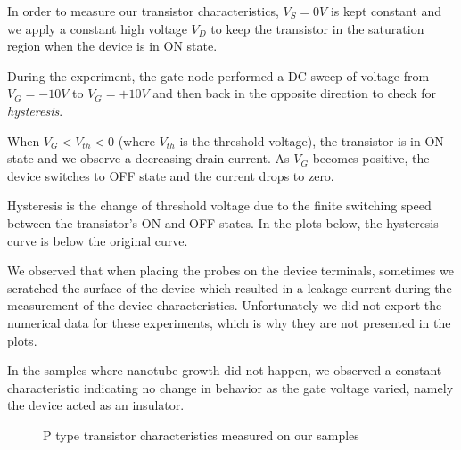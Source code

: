 \documentclass[a4paper,12pt,twoside]{article}
\begin{document}
In order to measure our transistor characteristics, $V_{S} = 0 V$ is kept constant and we apply a constant high voltage $V_D$ to keep the transistor in the saturation region when the device is in ON state.

During the experiment, the gate node performed a DC sweep of voltage from $V_G =-10V$ to $V_G=+10V$ and then back in the opposite direction to check for \textit{hysteresis}.

When $V_G < V_{th} < 0$ (where $V_{th}$ is the threshold voltage), the transistor is in ON state and we observe a decreasing drain current. As $V_G$ becomes positive, the device switches to OFF state and the current drops to zero.

Hysteresis is the change of threshold voltage due to the finite switching speed between the transistor's ON and OFF states. In the plots below, the hysteresis curve is below the original curve.

We observed that when placing the probes on the device terminals, sometimes we scratched the surface of the device which resulted in a leakage current during the measurement of the device characteristics. Unfortunately we did not export the numerical data for these experiments, which is why they are not presented in the plots.

In the samples where nanotube growth did not happen, we observed a constant characteristic indicating no change in behavior as the gate voltage varied, namely the device acted as an insulator.

\begin{figure}[h]
    \centering
\end{figure}

\begin{figure}[h]
    \centering
    \caption{P type transistor characteristics measured on our samples}
\end{figure}
\end{document}
